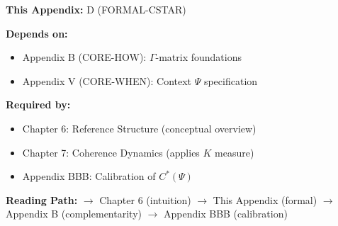 \begin{tcolorbox}[colback=gray!10!white, colframe=gray!75!black,
    title=\textbf{Cross-Reference Footer}]

\textbf{This Appendix:} D (FORMAL-CSTAR)

\textbf{Depends on:}
\begin{itemize}[nosep]
    \item Appendix B (CORE-HOW): $\Gamma$-matrix foundations
    \item Appendix V (CORE-WHEN): Context $\Psi$ specification
\end{itemize}

\textbf{Required by:}
\begin{itemize}[nosep]
    \item Chapter 6: Reference Structure (conceptual overview)
    \item Chapter 7: Coherence Dynamics (applies $K$ measure)
    \item Appendix BBB: Calibration of $C^*(\Psi)$
\end{itemize}

\textbf{Reading Path:}
$\rightarrow$ Chapter 6 (intuition) $\rightarrow$ This Appendix (formal)
$\rightarrow$ Appendix B (complementarity) $\rightarrow$ Appendix BBB (calibration)

\end{tcolorbox}

